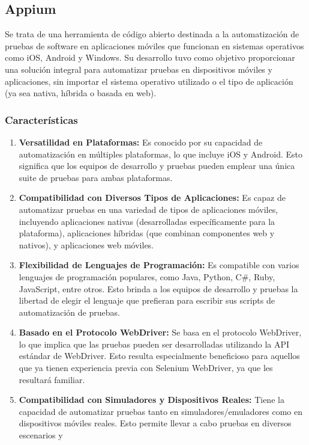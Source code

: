 \documentclass[letterpaper]{article}
\begin{document}
\subsection{Appium}
Se trata de una herramienta de código abierto destinada a la automatización de pruebas de software en aplicaciones
móviles que funcionan en sistemas operativos como iOS, Android y Windows. Su desarrollo tuvo como objetivo proporcionar
una solución integral para automatizar pruebas en dispositivos móviles y aplicaciones, sin importar el sistema
operativo utilizado o el tipo de aplicación (ya sea nativa, híbrida o basada en web).

\subsubsection{Características }
\begin{enumerate}[series=listWWNumxi,label=\arabic*.,ref=\arabic*]
\item \textbf{Versatilidad en Plataformas:} Es conocido por su capacidad de automatización en múltiples plataformas, lo
que incluye iOS y Android. Esto significa que los equipos de desarrollo y pruebas pueden emplear una única suite de
pruebas para ambas plataformas.
\item \textbf{Compatibilidad con Diversos Tipos de Aplicaciones:} Es capaz de automatizar pruebas en una variedad de
tipos de aplicaciones móviles, incluyendo aplicaciones nativas (desarrolladas específicamente para la plataforma),
aplicaciones híbridas (que combinan componentes web y nativos), y aplicaciones web móviles.
\item \textbf{Flexibilidad de Lenguajes de Programación:} Es compatible con varios lenguajes de programación populares,
como Java, Python, C\#, Ruby, JavaScript, entre otros. Esto brinda a los equipos de desarrollo y pruebas la libertad de
elegir el lenguaje que prefieran para escribir sus scripts de automatización de pruebas.
\item \textbf{Basado en el Protocolo WebDriver:} Se basa en el protocolo WebDriver, lo que implica que las pruebas
pueden ser desarrolladas utilizando la API estándar de WebDriver. Esto resulta especialmente beneficioso para aquellos
que ya tienen experiencia previa con Selenium WebDriver, ya que les resultará familiar.
\item \textbf{Compatibilidad con Simuladores y Dispositivos Reales:} Tiene la capacidad de automatizar pruebas tanto en
simuladores/emuladores como en dispositivos móviles reales. Esto permite llevar a cabo pruebas en diversos escenarios y

\end{enumerate}
\end{document}
